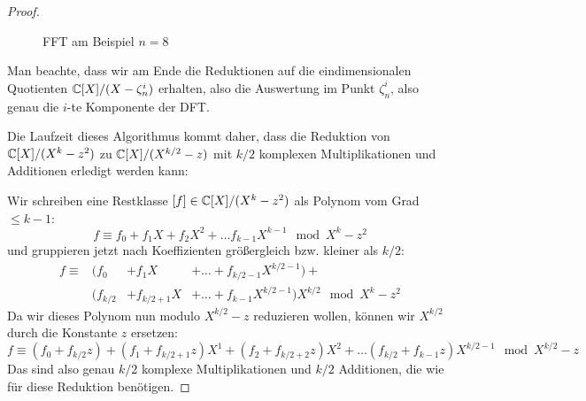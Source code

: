\begin{proof}
    \begin{figure}[hpt]
        \caption{FFT am Beispiel $n=8$}
        \label{fig:fft:example_n_equals_8}
    \end{figure}

    Man beachte, dass wir am Ende die Reduktionen auf die eindimensionalen Quotienten $\mathbb{C}[X]/(X - \zeta_n^i)$ erhalten, also die Auswertung im Punkt $\zeta_n^i$, also genau die $i$-te Komponente der DFT\@.

    \medskip
    Die Laufzeit dieses Algorithmus kommt daher, dass die Reduktion von $\mathbb{C}[X]/(X^k-z^2)$ zu $\mathbb{C}[X]/(X^{k/2}-z)$ mit $k/2$ komplexen Multiplikationen und Additionen erledigt werden kann:

    Wir schreiben eine Restklasse $[f] \in \mathbb{C}[X]/(X^k-z^2)$ als Polynom vom Grad $\leq k-1$:
    \[f \equiv f_0 + f_1 X + f_2 X^2 + \ldots f_{k-1}X^{k-1} \mod X^k-z^2\]
    und gruppieren jetzt nach Koeffizienten größergleich bzw. kleiner als $k/2$:
    \begin{align*}
        f \equiv & (f_0     &+ f_1 X      &+ \ldots + f_{k/2-1}X^{k/2-1}) + \\
        & (f_{k/2} &+ f_{k/2+1}X &+ \ldots + f_{k-1}X^{k/2-1})X^{k/2} \mod X^k-z^2
    \end{align*}
    Da wir dieses Polynom nun modulo $X^{k/2}-z$ reduzieren wollen, können wir $X^{k/2}$ durch die Konstante $z$ ersetzen:
    \[f \equiv (f_0+f_{k/2}z) + (f_1+f_{k/2+1}z)X^1+(f_2+f_{k/2+2}z)X^2 + \ldots (f_{k/2}+f_{k-1}z)X^{k/2-1} \mod X^{k/2}-z\]
    Das sind also genau $k/2$ komplexe Multiplikationen und $k/2$ Additionen, die wie für diese Reduktion benötigen.


\end{proof}
